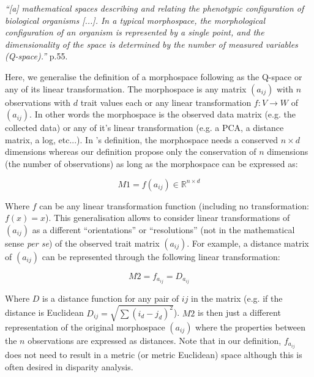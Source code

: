\documentclass[12pt,letterpaper]{article}
\begin{document}
\setlength{\leftskip}{1cm}
\setlength{\rightskip}{1cm}

\noindent \textit{``[a] mathematical spaces describing and relating the phenotypic configuration of biological organisms [...]. In a typical morphospace, the morphological configuration of an organism is represented by a single point, and the dimensionality of the space is determined by the number of measured variables (Q-space).''} \citealt{mitteroecker2009concept} p.55.

\setlength{\leftskip}{0pt}
\setlength{\rightskip}{0pt}

\noindent Here, we generalise the definition of a morphospace following \cite{mitteroecker2009concept} as the Q-space or any of its linear transformation.
The morphospace is any matrix $(a_{ij})$ with $n$ observations with $d$ trait values each or any linear transformation $f: V \to W$ of $(a_{ij})$.
In other words the morphospace is the observed data matrix (e.g. the collected data) or any of it's linear transformation (e.g. a PCA, a distance matrix, a log, etc...).
In \cite{mitteroecker2009concept}'s definition, the morphospace needs a conserved $n \times d$ dimensions whereas our definition propose only the conservation of $n$ dimensions (the number of observations) as long as the morphospace can be expressed as:

\begin{equation}
    M1 = f(a_{ij})\in \mathbb{R}^{{n}\times{d}}
\end{equation}

\noindent Where $f$ can be any linear transformation function (including no transformation: $f(x) = x$).
This generalisation allows to consider linear transformations of $(a_{ij})$ as a different ``orientations'' or ``resolutions'' (not in the mathematical sense \textit{per se}) of the observed trait matrix $(a_{ij})$. For example, a distance matrix of $(a_{ij})$ can be represented through the following linear transformation:

\begin{equation}
    M2 = f_{a_{ij}} = D_{a_{ij}}
\end{equation}

\noindent Where $D$ is a distance function for any pair of $ij$ in the matrix (e.g. if the distance is Euclidean $D_{ij} = \sqrt{\sum(i_{d}-j_{d})^2}$).
$M2$ is then just a different representation of the original morphospace $(a_{ij})$ where the properties between the $n$ observations are expressed as distances.
Note that in our definition, $f_{a_{ij}}$ does not need to result in a metric (or metric Euclidean) space although this is often desired in disparity analysis.
\end{document}
